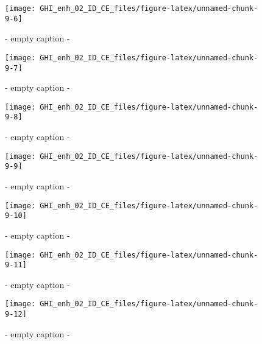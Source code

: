 \documentclass[
  10pt,
  a4paper,oneside]{article}
\begin{document}
\begin{figure}[H]

{\centering \texttt{[image: GHI\_enh\_02\_ID\_CE\_files/figure-latex/unnamed-chunk-9-6]} 

}

\caption{ - empty caption - }\label{fig:unnamed-chunk-9-6}
\end{figure}
\begin{figure}[H]

{\centering \texttt{[image: GHI\_enh\_02\_ID\_CE\_files/figure-latex/unnamed-chunk-9-7]} 

}

\caption{ - empty caption - }\label{fig:unnamed-chunk-9-7}
\end{figure}
\begin{figure}[H]

{\centering \texttt{[image: GHI\_enh\_02\_ID\_CE\_files/figure-latex/unnamed-chunk-9-8]} 

}

\caption{ - empty caption - }\label{fig:unnamed-chunk-9-8}
\end{figure}
\begin{figure}[H]

{\centering \texttt{[image: GHI\_enh\_02\_ID\_CE\_files/figure-latex/unnamed-chunk-9-9]} 

}

\caption{ - empty caption - }\label{fig:unnamed-chunk-9-9}
\end{figure}
\begin{figure}[H]

{\centering \texttt{[image: GHI\_enh\_02\_ID\_CE\_files/figure-latex/unnamed-chunk-9-10]} 

}

\caption{ - empty caption - }\label{fig:unnamed-chunk-9-10}
\end{figure}
\begin{figure}[H]

{\centering \texttt{[image: GHI\_enh\_02\_ID\_CE\_files/figure-latex/unnamed-chunk-9-11]} 

}

\caption{ - empty caption - }\label{fig:unnamed-chunk-9-11}
\end{figure}
\begin{figure}[H]

{\centering \texttt{[image: GHI\_enh\_02\_ID\_CE\_files/figure-latex/unnamed-chunk-9-12]} 

}

\caption{ - empty caption - }\label{fig:unnamed-chunk-9-12}
\end{figure}
\end{document}

